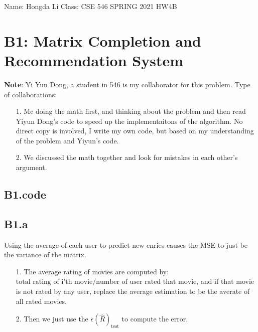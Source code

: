 \documentclass[]{article}
\begin{document}
\begin{center}
    Name: Hongda Li \quad Class: CSE 546 SPRING 2021 \quad HW4B    
\end{center}
\section*{B1: Matrix Completion and Recommendation System}
    \textbf{Note}: Yi Yun Dong, a student in 546 is my collaborator for this problem. Type of collaborations: 
    \begin{enumerate}
        \item[1.] Me doing the math first, and thinking about the problem and then read Yiyun Dong's code to speed up the implementaitons of the algorithm. No direct copy is involved, I write my own code, but based on my understanding of the problem and Yiyun's code. 
        \item[2.] We discussed the math together and look for mistakes in each other's argument.  
    \end{enumerate}
    \subsection*{B1.code}

    \subsection*{B1.a}
        Using the average of each user to predict new enries causes the MSE to just be the variance of the matrix. 
        \begin{enumerate}
            \item[1.] The average rating of movies are computed by: $\text{total rating of i'th movie}/\text{number of user rated that movie}$, and if that movie is not rated by any user, replace the average estimation to be the averate of all rated movies. 
            \item[2.] Then we just use the $\epsilon(\hat{R})_\text{test}$ to compute the error. 
        \end{enumerate}
\end{document}
